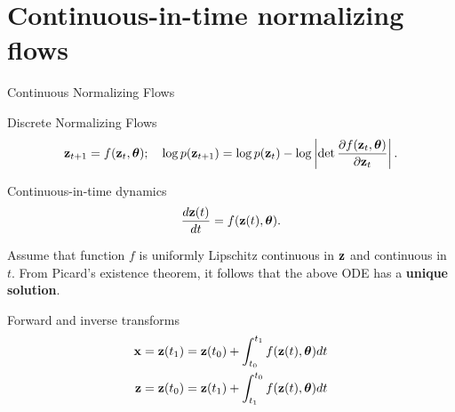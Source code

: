 \section{Continuous-in-time normalizing flows}
\begin{frame}{Continuous Normalizing Flows}
	\begin{block}{Discrete Normalizing Flows}
		\vspace{-0.8cm}
		  \[
		  \mathbf{z}_{t+1} = f(\mathbf{z}_t, \boldsymbol{\theta}); \quad \log p(\mathbf{z}_{t+1}) = \log p(\mathbf{z}_{t}) - \log \left| \det \frac{\partial f(\mathbf{z}_t, \boldsymbol{\theta})}{\partial \mathbf{z}_{t}} \right| .
		  \]
		\vspace{-0.7cm}
	\end{block}
	\begin{block}{Continuous-in-time dynamics}
		\vspace{-0.2cm}
		\[
			\frac{d\mathbf{z}(t)}{dt} = f(\mathbf{z}(t), \boldsymbol{\theta}).
		\]
		\vspace{-0.4cm}
	\end{block}
	Assume that function $f$ is uniformly Lipschitz continuous in $\mathbf{z}$ and continuous in $t$. From Picard’s existence theorem, it follows that the above ODE has a \textbf{unique solution}.
	\begin{block}{Forward and inverse transforms}
		\vspace{-0.7cm}
		\begin{align*}
			\mathbf{x} &= \mathbf{z}(t_1) = \mathbf{z}(t_0) + \int_{t_0}^{t_1} f(\mathbf{z}(t), \boldsymbol{\theta}) dt \\
			\mathbf{z} &= \mathbf{z}(t_0) = \mathbf{z}(t_1) + \int_{t_1}^{t_0} f(\mathbf{z}(t), \boldsymbol{\theta}) dt \\
		\end{align*}
	\end{block}
\end{frame}

